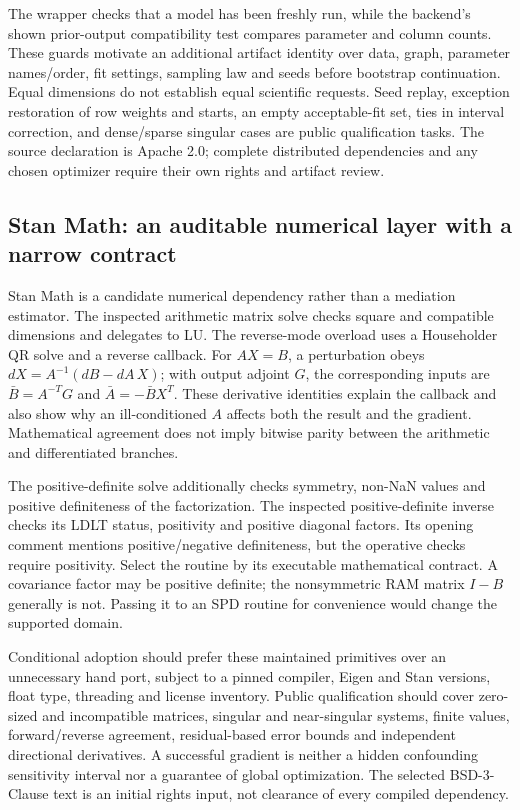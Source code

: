 The wrapper checks that a model has been freshly run, while the backend's shown
prior-output compatibility test compares parameter and column counts. These
guards motivate an additional artifact identity over data, graph, parameter
names/order, fit settings, sampling law and seeds before bootstrap continuation.
Equal dimensions do not establish equal scientific requests. Seed replay,
exception restoration of row weights and starts, an empty acceptable-fit set,
ties in interval correction, and dense/sparse singular cases are public
qualification tasks. The source declaration is Apache 2.0; complete distributed
dependencies and any chosen optimizer require their own rights and artifact
review.\citep{exec25_cmed_openmx}

\subsection{Stan Math: an auditable numerical layer with a narrow contract}

Stan Math is a candidate numerical dependency rather than a mediation estimator.
The inspected arithmetic matrix solve checks square and compatible dimensions
and delegates to LU. The reverse-mode overload uses a Householder QR solve and
a reverse callback. For $AX=B$, a perturbation obeys
$dX=A^{-1}(dB-dA\,X)$; with output adjoint $G$, the corresponding inputs are
$\bar B=A^{-T}G$ and $\bar A=-\bar B X^T$. These derivative identities explain
the callback and also show why an ill-conditioned $A$ affects both the result
and the gradient. Mathematical agreement does not imply bitwise parity between
the arithmetic and differentiated branches.\citep{exec25_cmed_stanmath}

The positive-definite solve additionally checks symmetry, non-NaN values and
positive definiteness of the factorization. The inspected positive-definite
inverse checks its LDLT status, positivity and positive diagonal factors. Its
opening comment mentions positive/negative definiteness, but the operative
checks require positivity. Select the routine by its executable mathematical
contract. A covariance factor may be positive definite; the nonsymmetric RAM
matrix $I-B$ generally is not. Passing it to an SPD routine for convenience would
change the supported domain.\citep{exec25_cmed_stanmath}

Conditional adoption should prefer these maintained primitives over an
unnecessary hand port, subject to a pinned compiler, Eigen and Stan versions,
float type, threading and license inventory. Public qualification should cover
zero-sized and incompatible matrices, singular and near-singular systems,
finite values, forward/reverse agreement, residual-based error bounds and
independent directional derivatives. A successful gradient is neither a hidden
confounding sensitivity interval nor a guarantee of global optimization.
The selected BSD-3-Clause text is an initial rights input, not clearance of
every compiled dependency.\citep{exec25_cmed_stanmath,exec25_cmed_choice}

